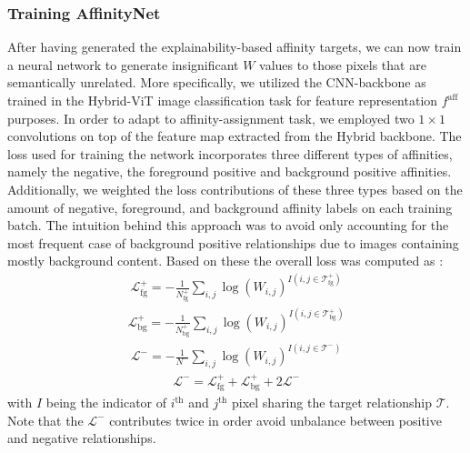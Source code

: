 \subsubsection{Training AffinityNet}
After having generated the explainability-based affinity targets, we can now train a neural network to generate insignificant $W$ values to those pixels that are semantically unrelated. More specifically, we utilized the CNN-backbone as trained in the Hybrid-ViT image classification task for feature representation $f^\text{aff}$ purposes. In order to adapt to affinity-assignment task, we employed two $1\times1$ convolutions on top of the feature map extracted from the Hybrid backbone. The loss used for training the network incorporates three different types of affinities, namely the negative, the foreground positive and background positive affinities. Additionally, we weighted the loss contributions of these three types based on the amount of negative, foreground, and background affinity labels on each training batch. The intuition behind this approach was to avoid only accounting for the most frequent case of background positive relationships due to images containing mostly background content. Based on these the overall loss was computed as :
\begin{align*}
\label{eq:dropweight}
\mathcal{L}_\text{fg}^+ =- \frac{1}{N_\text{fg}^+}\sum_{i,j}\log(W_{i,j})^{I(i,j\in \mathcal{T}_\text{fg}^+)}
\end{align*}
\begin{align*}
\label{eq:dropweight}
\mathcal{L}_\text{bg}^+ =- \frac{1}{N_\text{bg}^+}\sum_{i,j}\log(W_{i,j})^{I(i,j\in \mathcal{T}_\text{bg}^+) }
\end{align*}
\begin{align*}
\label{eq:dropweight}
\mathcal{L}^- =- \frac{1}{N^-}\sum_{i,j}\log(W_{i,j})^{I(i,j\in \mathcal{T}^-) }
\end{align*}
\begin{align*}
\label{eq:dropweight}
\mathcal{L}^- = \mathcal{L}_\text{fg}^+ + \mathcal{L}_\text{bg}^+ + 2\mathcal{L}^-
\end{align*}
with $I$ being the indicator of $i^\text{th}$ and $j^\text{th}$ pixel sharing the target relationship $\mathcal{T}$. Note that the $\mathcal{L}^-$ contributes twice in order avoid unbalance between positive and negative relationships.

